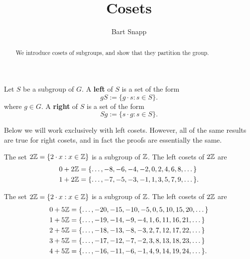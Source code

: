 \documentclass{ximera}
\author{Bart Snapp}
\title{Cosets}
\begin{document}
\begin{abstract}
We introduce cosets of subgroups, and show that they partition the
group.
\end{abstract}
\maketitle


\begin{definition}
  Let $S$ be a subgroup of $G$. A \textbf{left } of $S$ is a set of
  the form
  \[
  gS := \{g\cdot s : s\in S\}.
  \]
  where $g\in G$. A \textbf{right } of $S$ is a set of the form
  \[
  Sg := \{s\cdot g : s\in S\}.
  \]
\end{definition}

\begin{remark}
  Below we will work exclusively with left cosets. However, all of the
  same results are true for right cosets, and in fact the proofs are
  essentially the same.
\end{remark}



\begin{example}
  The set $2\mathbb Z = \{2\cdot x: x\in \mathbb Z\}$ is a subgroup of $\mathbb Z$. The
  left cosets of $2\mathbb Z$ are
  \begin{align*}
    0+2\mathbb Z &= \{\dots, -8,-6,-4,-2,0,2,4,6,8,\dots\}\\
    1+2\mathbb Z &= \{\dots, -7,-5,-3,-1,1,3,5,7,9,\dots\}.
  \end{align*}
\end{example}


\begin{example}
  The set $2\mathbb Z = \{2\cdot x: x\in \mathbb Z\}$ is a subgroup of $\mathbb Z$. The
  left cosets of $2\mathbb Z$ are
  \begin{align*}
    0+5\mathbb Z &= \{\dots, -20,-15,-10,-5,0,5,10,15,20,\dots\}\\
    1+5\mathbb Z &= \{\dots, -19,-14,-9 ,-4,1,6,11,16,21,\dots\}\\
    2+5\mathbb Z &= \{\dots, -18,-13,-8 ,-3,2,7,12,17,22,\dots\}\\
    3+5\mathbb Z &= \{\dots, -17,-12,-7 ,-2,3,8,13,18,23,\dots\}\\
    4+5\mathbb Z &= \{\dots, -16,-11,-6 ,-1,4,9,14,19,24,\dots\}.
  \end{align*}
\end{example}
\end{document}
